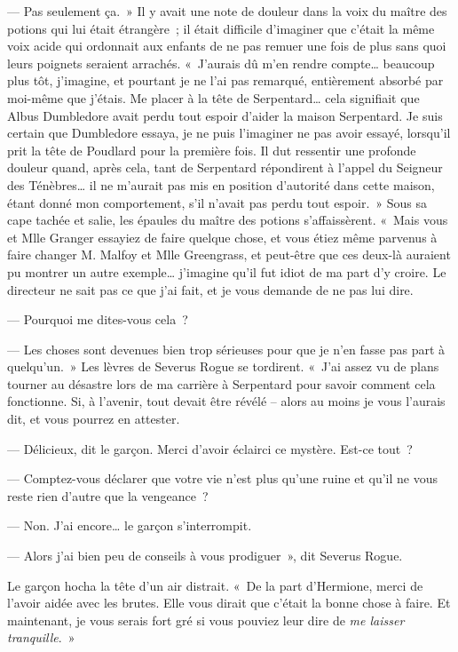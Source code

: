 --- Pas seulement ça.~» Il y avait une note de douleur dans la voix du maître des potions qui lui était étrangère~; il était difficile d'imaginer que c'était la même voix acide qui ordonnait aux enfants de ne pas remuer une fois de plus sans quoi leurs poignets seraient arrachés. «~J'aurais dû m'en rendre compte… beaucoup plus tôt, j'imagine, et pourtant je ne l'ai pas remarqué, entièrement absorbé par moi-même que j'étais. Me placer à la tête de Serpentard… cela signifiait que Albus Dumbledore avait perdu tout espoir d'aider la maison Serpentard. Je suis certain que Dumbledore essaya, je ne puis l'imaginer ne pas avoir essayé, lorsqu'il prit la tête de Poudlard pour la première fois. Il dut ressentir une profonde douleur quand, après cela, tant de Serpentard répondirent à l'appel du Seigneur des Ténèbres… il ne m'aurait pas mis en position d'autorité dans cette maison, étant donné mon comportement, s'il n'avait pas perdu tout espoir.~» Sous sa cape tachée et salie, les épaules du maître des potions s'affaissèrent. «~Mais vous et Mlle Granger essayiez de faire quelque chose, et vous étiez même parvenus à faire changer M. Malfoy et Mlle Greengrass, et peut-être que ces deux-là auraient pu montrer un autre exemple… j'imagine qu'il fut idiot de ma part d'y croire. Le directeur ne sait pas ce que j'ai fait, et je vous demande de ne pas lui dire.

--- Pourquoi me dites-vous cela~?

--- Les choses sont devenues bien trop sérieuses pour que je n'en fasse pas part à quelqu'un.~» Les lèvres de Severus Rogue se tordirent. «~J'ai assez vu de plans tourner au désastre lors de ma carrière à Serpentard pour savoir comment cela fonctionne. Si, à l'avenir, tout devait être révélé -- alors au moins je vous l'aurais dit, et vous pourrez en attester.

--- Délicieux, dit le garçon. Merci d'avoir éclairci ce mystère. Est-ce tout~?

--- Comptez-vous déclarer que votre vie n'est plus qu'une ruine et qu'il ne vous reste rien d'autre que la vengeance~?

--- Non. J'ai encore… le garçon s'interrompit.

--- Alors j'ai bien peu de conseils à vous prodiguer~», dit Severus Rogue.

Le garçon hocha la tête d'un air distrait. «~De la part d'Hermione, merci de l'avoir aidée avec les brutes. Elle vous dirait que c'était la bonne chose à faire. Et maintenant, je vous serais fort gré si vous pouviez leur dire de \emph{me laisser tranquille}.~»


